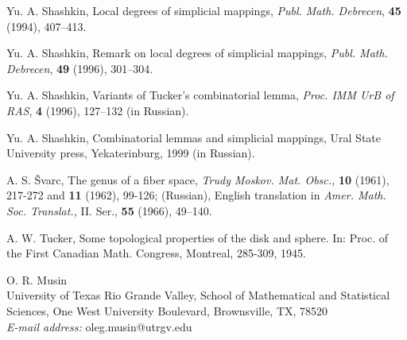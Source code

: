 \documentclass[a4paper,12pt]{article}
\begin{document}
\begin{thebibliography}{99}
Yu. A. Shashkin, Local degrees of simplicial mappings, {\it Publ. Math. Debrecen}, {\bf 45} (1994), 407--413.


Yu. A. Shashkin, Remark on local degrees of simplicial mappings, {\it Publ. Math. Debrecen}, {\bf 49} (1996), 301--304.

Yu. A. Shashkin, Variants of Tucker's combinatorial lemma, {\it Proc. IMM UrB of RAS}, {\bf 4} (1996),  127--132 (in Russian).

Yu. A. Shashkin, Combinatorial lemmas and simplicial mappings, Ural State University press, Yekaterinburg, 1999 (in Russian).


A. S. \v Svarc, The genus of a fiber space, {\it Trudy Moskov. Mat. Obsc.,} {\bf 10} (1961), 217-272 and {\bf 11} (1962), 99-126; (Russian), English translation in {\it Amer. Math. Soc. Translat.,} II. Ser., {\bf 55} (1966), 49--140.


A. W. Tucker,  Some topological properties of the disk and sphere. In: Proc. of the First Canadian Math. Congress, Montreal, 285-309, 1945.




 \end{thebibliography}

 \medskip

\noindent O. R. Musin\\ 
 University of Texas Rio Grande Valley, School of Mathematical and Statistical Sciences, One West University Boulevard, Brownsville, TX, 78520 \\
{\it E-mail address:} oleg.musin@utrgv.edu
\end{document}
